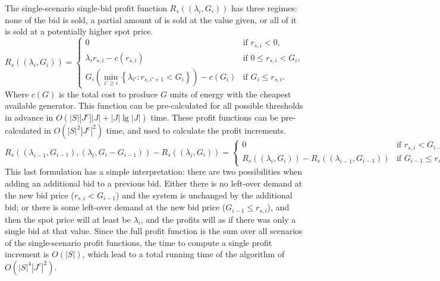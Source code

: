 \documentclass[12pt]{article}
\begin{document}
The single-scenario single-bid profit function $R_s((\lambda_i, G_i))$
has three regimes: none of the bid is sold, a partial amount of is sold
at the value given, or all of it is sold at a potentially higher spot price.
\begin{equation}
R_s((\lambda_i, G_i)) = \left\{
	\begin{array}{cl}
	0 & \mbox{if } r_{s,i} < 0, \\
	\lambda_i r_{s,i} - c(r_{s,i}) & \mbox{if } 0 \le r_{s,i} < G_i, \\
	G_i \left( \min_{i' \ge i} \left\{ \lambda_{i'} : r_{s,i'+1} < G_i \right\} \right) - c(G_i) & \mbox{if } G_i \le r_{s,i}.
	\end{array}
\right.
\end{equation}
Where $c(G)$ is the total cost to produce $G$ units of energy with the
cheapest available generator. This function can be pre-calculated for all
possible thresholds in advance in $O(|S| |J^c| |J| + |J| \lg |J|)$ time.
These profit functions can be pre-calculated in $O(|S|^2 |J^c|^2)$ time,
and used to calculate the profit increments.
\begin{equation}
R_s\left( (\lambda_{i-1}, G_{i-1}), (\lambda_i, G_i - G_{i-1}) \right) -
R_s((\lambda_i, G_i)) = \left\{
	\begin{array}{cl}
	0 & \mbox{if } r_{s,i} < G_{i-1}, \\
	R_s((\lambda_i, G_i)) - R_s((\lambda_{i-1}, G_{i-1})) & \mbox{if } G_{i-1} \le r_{s,i}.
	\end{array}
\right.
\end{equation}
This last formulation has a simple interpretation: there are two possibilities
when adding an additional bid to a previous bid. Either there is no left-over
demand at the new bid price ($r_{s,i} < G_{i-1}$) and the system is unchanged
by the additional bid; or there is some left-over demand at the new bid price
($G_{i-1} \le r_{s,i}$), and then the spot price will at least be $\lambda_i$,
and the profits will as if there was only a single bid at that value.
Since the full profit function is the sum over all scenarios of the
single-scenario profit functions, the time to compute a single profit
increment is $O(|S|)$, which lead to a total running time of the algorithm
of $O(|S|^4 |J^c|^2)$.
\end{document}
